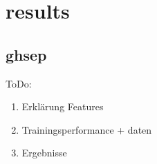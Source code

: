 \chapter{results}\label{results}

\section{ghsep}\label{ghsep}

ToDo:
\begin{enumerate}[nosep]
    \item Erklärung Features
    \item Trainingsperformance + daten
    \item Ergebnisse
\end{enumerate}
